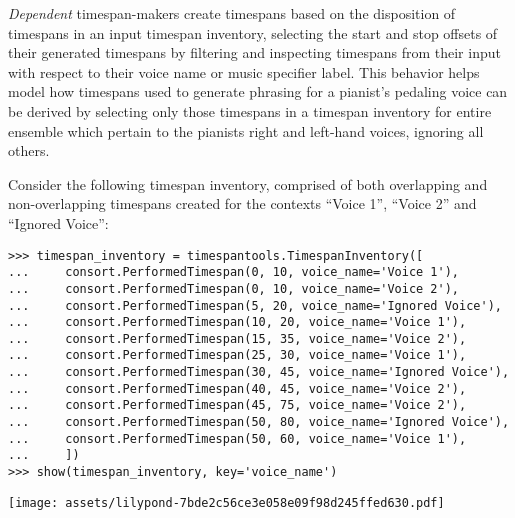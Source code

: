 \emph{Dependent} timespan-makers create timespans based on the disposition of
timespans in an input timespan inventory, selecting the start and stop offsets
of their generated timespans by filtering and inspecting timespans from their
input with respect to their voice name or music specifier label. This behavior
helps model how timespans used to generate phrasing for a pianist's pedaling
voice can be derived by selecting only those timespans in a timespan inventory
for entire ensemble which pertain to the pianists right and left-hand voices,
ignoring all others.

Consider the following timespan inventory, comprised of both overlapping and
non-overlapping timespans created for the contexts \enquote{Voice 1},
\enquote{Voice 2} and \enquote{Ignored Voice}:

\begin{comment}
<abjad>
timespan_inventory = timespantools.TimespanInventory([
    consort.PerformedTimespan(0, 10, voice_name='Voice 1'),
    consort.PerformedTimespan(0, 10, voice_name='Voice 2'),
    consort.PerformedTimespan(5, 20, voice_name='Ignored Voice'),
    consort.PerformedTimespan(10, 20, voice_name='Voice 1'),
    consort.PerformedTimespan(15, 35, voice_name='Voice 2'),
    consort.PerformedTimespan(25, 30, voice_name='Voice 1'),
    consort.PerformedTimespan(30, 45, voice_name='Ignored Voice'),
    consort.PerformedTimespan(40, 45, voice_name='Voice 2'),
    consort.PerformedTimespan(45, 75, voice_name='Voice 2'),
    consort.PerformedTimespan(50, 80, voice_name='Ignored Voice'),
    consort.PerformedTimespan(50, 60, voice_name='Voice 1'),
    ])
show(timespan_inventory, key='voice_name')
</abjad>
\end{comment}

\begin{singlespacing}
\vspace{-0.5\baselineskip}
\begin{lstlisting}
>>> timespan_inventory = timespantools.TimespanInventory([
...     consort.PerformedTimespan(0, 10, voice_name='Voice 1'),
...     consort.PerformedTimespan(0, 10, voice_name='Voice 2'),
...     consort.PerformedTimespan(5, 20, voice_name='Ignored Voice'),
...     consort.PerformedTimespan(10, 20, voice_name='Voice 1'),
...     consort.PerformedTimespan(15, 35, voice_name='Voice 2'),
...     consort.PerformedTimespan(25, 30, voice_name='Voice 1'),
...     consort.PerformedTimespan(30, 45, voice_name='Ignored Voice'),
...     consort.PerformedTimespan(40, 45, voice_name='Voice 2'),
...     consort.PerformedTimespan(45, 75, voice_name='Voice 2'),
...     consort.PerformedTimespan(50, 80, voice_name='Ignored Voice'),
...     consort.PerformedTimespan(50, 60, voice_name='Voice 1'),
...     ])
>>> show(timespan_inventory, key='voice_name')
\end{lstlisting}
\noindent\texttt{[image: assets/lilypond-7bde2c56ce3e058e09f98d245ffed630.pdf]}
\end{singlespacing}

